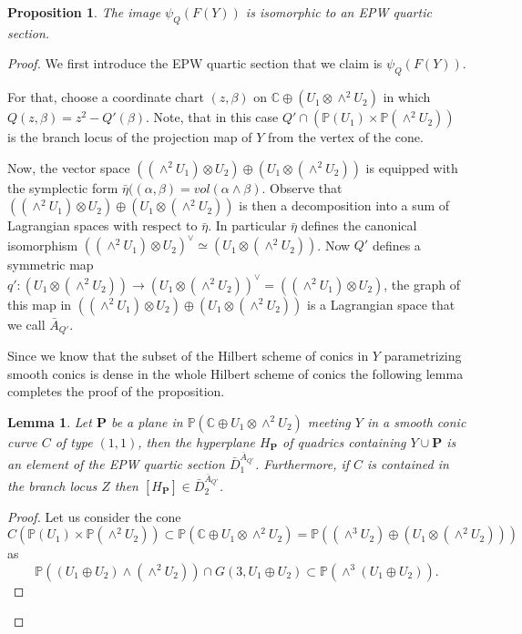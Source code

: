 \documentclass[a4paper,11pt]{amsart}
\newtheorem{lem}[thm]{Lemma}
\newtheorem{prop}[thm]{Proposition}
\theoremstyle{definition}
\numberwithin{equation}{section}
\numberwithin{equation}{section} \theoremstyle{definition}
\begin{document}
\begin{prop}The image $\psi_Q (F(Y))$  is isomorphic to an EPW quartic section. 
\end{prop}
\begin{proof}
We first introduce the EPW quartic section that we claim is $\psi_Q (F(Y))$.

For that, choose a coordinate chart $(z,\beta)$ on ${{\mathbb{C}  }}\oplus (U_1\otimes \wedge^2 U_2)$ in which $Q(z,\beta)=z^2-Q'(\beta)$. Note, that in this case $Q'\cap ({{\mathbb{P}}}(U_1)\times {{\mathbb{P}}}(\wedge^2U_2))$ is the branch locus of  the projection map of $Y$ from the vertex of the cone.

Now, the vector space $((\wedge^2 U_1) \otimes U_2)\oplus (U_1 \otimes (\wedge^2 U_2)) $ is equipped with the symplectic form $\bar{\eta}((\alpha,\beta)=vol(\alpha\wedge \beta)$. Observe that $((\wedge^2 U_1) \otimes U_2)\oplus (U_1 \otimes (\wedge^2 U_2)) $ is then a decomposition into a sum of Lagrangian spaces with respect to $\bar{\eta}$. In particular $\bar{\eta}$ defines the canonical  isomorphism  $((\wedge^2 U_1) \otimes U_2)^{\vee}\simeq (U_1 \otimes (\wedge^2 U_2))$. Now $Q'$ defines a symmetric map $q':(U_1 \otimes (\wedge^2 U_2))\to  (U_1 \otimes (\wedge^2 U_2))^{\vee}=((\wedge^2 U_1) \otimes U_2)$, the graph of this map in $((\wedge^2 U_1) \otimes U_2)\oplus (U_1 \otimes (\wedge^2 U_2)) $ is a Lagrangian space that we call $\bar{A}_{Q'}$.

Since we know that the subset of the Hilbert scheme of conics in $Y$ parametrizing smooth conics is dense in the whole Hilbert scheme of conics the following lemma completes the proof of the proposition.
\begin{lem}\label{hilbert scheme of conics to lagrangian} Let $\mathbf{P}$ be a plane in ${{\mathbb{P}}}({{\mathbb{C}  }}\oplus U_1\otimes \wedge^2 U_2)$ meeting $Y$ in a smooth conic curve $C$ of type $(1,1)$, then the hyperplane $H_\mathbf{P}$ of quadrics containing $Y\cup \mathbf{P}$ is an element of  the EPW quartic section $\bar{D}^{\bar{A}_{Q'}}_1$. Furthermore, if $C$ is contained in the branch locus  $Z$ then $[H_\mathbf{P}]\in
 \bar{D}^{\bar{A}_{Q'}}_2$.
\end{lem}\medskip
\begin{proof}
Let us consider the cone 
\[
C({{\mathbb{P}}}(U_1)\times {{\mathbb{P}}}(\wedge^2 U_2))\subset {{\mathbb{P}}}({{\mathbb{C}  }}\oplus U_1\otimes \wedge^2 U_2) ={{\mathbb{P}}}((\wedge^3 U_2) \oplus (U_1\otimes (\wedge^2 U_2)))
\]
 as 
 \[
 {{\mathbb{P}}}((U_1\oplus U_2)\wedge (\wedge^2 U_2))\cap G(3,U_1\oplus U_2)\subset {{\mathbb{P}}}(\wedge^3 (U_1\oplus U_2)).
 \] 


\end{proof}
\end{proof}
\end{document}
